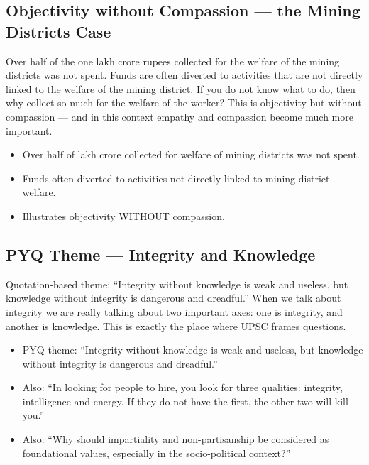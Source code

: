 \subsection{Objectivity without Compassion --- the Mining Districts Case}

Over half of the one lakh crore rupees collected for the welfare of the mining districts was not spent. Funds are often diverted to activities that are not directly linked to the welfare of the mining district. If you do not know what to do, then why collect so much for the welfare of the worker? This is objectivity but without compassion --- and in this context empathy and compassion become much more important.

\begin{DataFact}
\begin{itemize}
\item Over half of  lakh crore collected for welfare of mining districts was not spent.
\item Funds often diverted to activities not directly linked to mining-district welfare.
\item Illustrates objectivity WITHOUT compassion.
\end{itemize}
\end{DataFact}

\subsection{PYQ Theme --- Integrity and Knowledge}

Quotation-based theme: ``Integrity without knowledge is weak and useless, but knowledge without integrity is dangerous and dreadful.'' When we talk about integrity we are really talking about two important axes: one is integrity, and another is knowledge. This is exactly the place where UPSC frames questions.

\begin{PYQLink}
\begin{itemize}
\item PYQ theme: ``Integrity without knowledge is weak and useless, but knowledge without integrity is dangerous and dreadful.''
\item Also: ``In looking for people to hire, you look for three qualities: integrity, intelligence and energy. If they do not have the first, the other two will kill you.''
\item Also: ``Why should impartiality and non-partisanship be considered as foundational values, especially in the socio-political context?''
\end{itemize}
\end{PYQLink}

